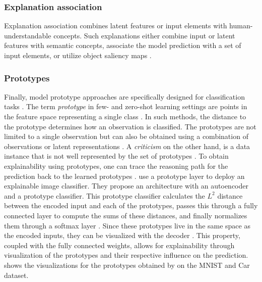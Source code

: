 \subsubsection{Explanation association}
Explanation association combines latent features or input elements with human-understandable concepts. Such explanations either combine input or latent features with semantic concepts, associate the model prediction with a set of input elements, or utilize object saliency maps \citep{xie2020explainable}.

\subsubsection{Prototypes}
Finally, model prototype approaches are specifically designed for classification tasks \citep{Bien2011, KimRS14, PriebeMDS03, wu2017prototypal}. The term \emph{prototype} in few- and zero-shot learning settings are points in the feature space representing a single class \citep{LiLCR18}. In such methods, the distance to the prototype determines how an observation is classified. The prototypes are not limited to a single observation but can also be obtained using a combination of observations or latent representations \citep{xie2020explainable}. A \emph{criticism} on the other hand, is a data instance that is not well represented by the set of prototypes \citep{molnar2019}. To obtain explainability using prototypes, one can trace the reasoning path for the prediction back to the learned prototypes \citep{xie2020explainable}. \citet{LiLCR18} use a prototype layer to deploy an explainable image classifier. They propose an architecture with an autoencoder and a prototype classifier. This prototype classifier calculates the $L^2$ distance between the encoded input and each of the prototypes, passes this through a fully connected layer to compute the sums of these distances, and finally normalizes them through a softmax layer \citep{LiLCR18}. Since these prototypes live in the same space as the encoded inputs, they can be visualized with the decoder \citep{LiLCR18}. This property, coupled with the fully connected weights, allows for explainability through visualization of the prototypes and their respective influence on the prediction.  shows the visualizations for the prototypes obtained by \citet{LiLCR18} on the MNIST \citep{lecun-mnisthandwrittendigit-2010} and Car \citep{FidlerDU12} dataset.


